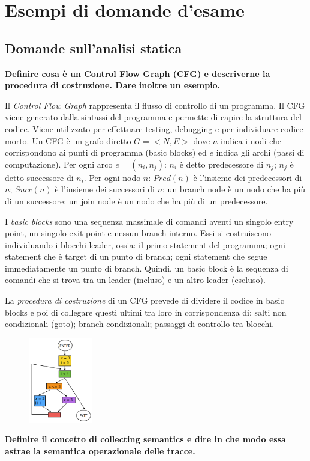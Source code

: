 \documentclass[a4paper,oneside,titlepage]{book}
\begin{document}
\chapter{Esempi di domande d'esame}

\section{Domande sull'analisi statica}
\textbf{Definire cosa è un Control Flow Graph (CFG) e descriverne la procedura di costruzione. Dare inoltre un esempio.}

Il \textit{Control Flow Graph} rappresenta il flusso di controllo di un programma. Il CFG viene generato dalla sintassi del programma e permette di capire la struttura del codice. Viene utilizzato per effettuare testing, debugging e per individuare codice morto. Un CFG è un grafo diretto $G = <N,E>$ dove $n$ indica i nodi che corrispondono ai punti di programma (basic blocks) ed $e$ indica gli archi (passi di computazione). Per ogni arco $e = (n_i, n_j)$: $n_i$ è detto predecessore di $n_j$; $n_j$ è detto successore di $n_i$. Per ogni nodo $n$: $Pred(n)$ è l'insieme dei predecessori di $n$; $Succ(n)$ è l'insieme dei successori di $n$; un branch node è un nodo che ha più di un successore; un join node è un nodo che ha più di un predecessore.

I \textit{basic blocks} sono una sequenza massimale di comandi aventi un singolo entry point, un singolo exit point e nessun branch interno. Essi si costruiscono individuando i blocchi leader, ossia: il primo statement del programma; ogni statement che è target di un punto di branch; ogni statement che segue immediatamente un punto di branch. Quindi, un basic block è la sequenza di comandi che si trova tra un leader (incluso) e un altro leader (escluso).

La \textit{procedura di costruzione} di un CFG prevede di dividere il codice in basic blocks e poi di collegare questi ultimi tra loro in corrispondenza di: salti non condizionali (goto); branch condizionali; passaggi di controllo tra blocchi.
\begin{figure}[htp]
	\centering
	\includegraphics[width=0.25\textwidth]{cfg.png}
\end{figure}
\newpage
\noindent
\textbf{Definire il concetto di collecting semantics e dire in che modo essa astrae la semantica operazionale delle tracce.}
\end{document}
